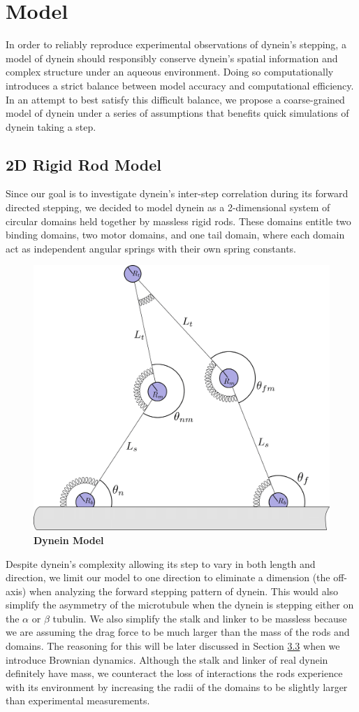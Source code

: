\section{Model}
In order to reliably reproduce experimental observations of dynein's stepping, a model of dynein should responsibly conserve dynein's spatial information and complex structure under an aqueous environment. Doing so computationally introduces a strict balance between model accuracy and computational efficiency. In an attempt to best satisfy this difficult balance, we propose a coarse-grained model of dynein under a series of assumptions that benefits quick simulations of dynein taking a step. 


\subsection{2D Rigid Rod Model}
Since our goal is to investigate dynein's inter-step correlation during its forward directed stepping, we decided to model dynein as a 2-dimensional system of circular domains held together by massless rigid rods. These domains entitle two binding domains, two motor domains, and one tail domain, where each domain act as independent angular springs with their own spring constants.

\begin{figure}[H]
	\centering
	\includegraphics[width=0.6\columnwidth]{Figures/model-cartoon.png}
	\caption[Dynein Model]{\textbf{Dynein Model} \cite{Capek2017}}
	\label{fig:model}
\end{figure}

Despite dynein's complexity allowing its step to vary in both length and direction, we limit our model to one direction to eliminate a dimension (the off-axis) when analyzing the forward stepping pattern of dynein. This would also simplify the asymmetry of the microtubule when the dynein is stepping either on the $\alpha$ or $\beta$ tubulin. We also simplify the stalk and linker to be massless because we are assuming the drag force to be much larger than the mass of the rods and domains. The reasoning for this will be later discussed in Section \hyperref[sec:BrownianDynamics]{3.3} when we introduce Brownian dynamics. Although the stalk and linker of real dynein definitely have mass, we counteract the loss of interactions the rods experience with its environment by increasing the radii of the domains to be slightly larger than experimental measurements.

